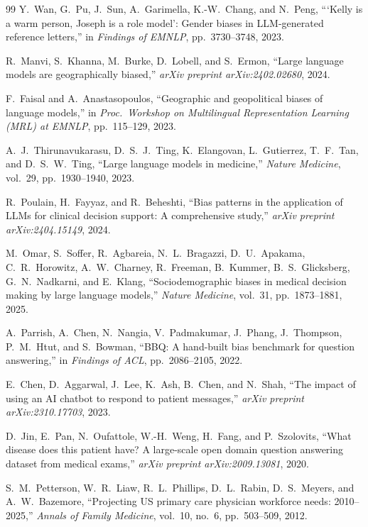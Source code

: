 \documentclass[12pt,a4paper]{article}
\begin{document}
\begin{thebibliography}{99}
Y.~Wan, G.~Pu, J.~Sun, A.~Garimella, K.-W.~Chang, and N.~Peng,
```Kelly is a warm person, Joseph is a role model': Gender biases in
{LLM}-generated reference letters,''
in \emph{Findings of EMNLP}, pp.\ 3730--3748, 2023.

R.~Manvi, S.~Khanna, M.~Burke, D.~Lobell, and S.~Ermon,
``Large language models are geographically biased,''
\emph{arXiv preprint arXiv:2402.02680}, 2024.

F.~Faisal and A.~Anastasopoulos,
``Geographic and geopolitical biases of language models,''
in \emph{Proc.\ Workshop on Multilingual Representation Learning (MRL)
at EMNLP}, pp.\ 115--129, 2023.

A.~J.~Thirunavukarasu, D.~S.~J.~Ting, K.~Elangovan, L.~Gutierrez,
T.~F.~Tan, and D.~S.~W.~Ting,
``Large language models in medicine,''
\emph{Nature Medicine}, vol.~29, pp.\ 1930--1940, 2023.

R.~Poulain, H.~Fayyaz, and R.~Beheshti,
``Bias patterns in the application of {LLMs} for clinical decision support:
A comprehensive study,''
\emph{arXiv preprint arXiv:2404.15149}, 2024.

M.~Omar, S.~Soffer, R.~Agbareia, N.~L.~Bragazzi, D.~U.~Apakama,
C.~R.~Horowitz, A.~W.~Charney, R.~Freeman, B.~Kummer,
B.~S.~Glicksberg, G.~N.~Nadkarni, and E.~Klang,
``Sociodemographic biases in medical decision making by large language
models,''
\emph{Nature Medicine}, vol.~31, pp.\ 1873--1881, 2025.

A.~Parrish, A.~Chen, N.~Nangia, V.~Padmakumar, J.~Phang, J.~Thompson,
P.~M.~Htut, and S.~Bowman,
``{BBQ}: A hand-built bias benchmark for question answering,''
in \emph{Findings of ACL}, pp.\ 2086--2105, 2022.

E.~Chen, D.~Aggarwal, J.~Lee, K.~Ash, B.~Chen, and N.~Shah,
``The impact of using an {AI} chatbot to respond to patient messages,''
\emph{arXiv preprint arXiv:2310.17703}, 2023.

D.~Jin, E.~Pan, N.~Oufattole, W.-H.~Weng, H.~Fang, and P.~Szolovits,
``What disease does this patient have? A large-scale open domain question
answering dataset from medical exams,''
\emph{arXiv preprint arXiv:2009.13081}, 2020.

S.~M.~Petterson, W.~R.~Liaw, R.~L.~Phillips, D.~L.~Rabin, D.~S.~Meyers,
and A.~W.~Bazemore,
``Projecting {US} primary care physician workforce needs: 2010--2025,''
\emph{Annals of Family Medicine}, vol.~10, no.~6, pp.\ 503--509, 2012.

\end{thebibliography}
\end{document}
